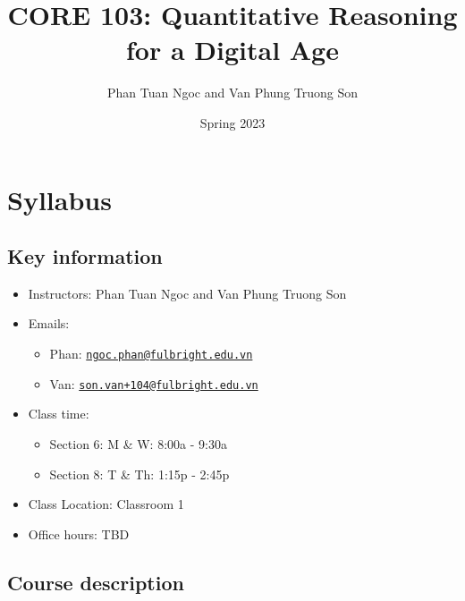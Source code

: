 \documentclass[
]{article}
\title{CORE 103: Quantitative Reasoning for a Digital Age}
\author{Phan Tuan Ngoc and Van Phung Truong Son}
\date{Spring 2023}
\providecommand{\tightlist}{%
  \setlength{\itemsep}{0pt}\setlength{\parskip}{0pt}}
\begin{document}
\maketitle

{
\setcounter{tocdepth}{2}
\tableofcontents
}
\hypertarget{syllabus}{%
\section*{Syllabus}\label{syllabus}}

\hypertarget{key-information}{%
\subsection*{Key information}\label{key-information}}

\begin{itemize}
\tightlist
\item
  Instructors: Phan Tuan Ngoc and Van Phung Truong Son
\item
  Emails:

  \begin{itemize}
  \tightlist
  \item
    Phan: \href{mailto:ngoc.phan@fulbright.edu.vn}{\nolinkurl{ngoc.phan@fulbright.edu.vn}}
  \item
    Van: \href{mailto:son.van+104@fulbright.edu.vn}{\nolinkurl{son.van+104@fulbright.edu.vn}}
  \end{itemize}
\item
  Class time:

  \begin{itemize}
  \tightlist
  \item
    Section 6: M \& W: 8:00a - 9:30a
  \item
    Section 8: T \& Th: 1:15p - 2:45p
  \end{itemize}
\item
  Class Location: Classroom 1
\item
  Office hours: TBD
\end{itemize}

\hypertarget{course-description}{%
\subsection*{Course description}\label{course-description}}
\end{document}

